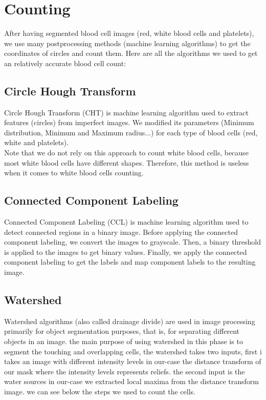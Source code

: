 \section{Counting}
\vspace{0.2in}
\hspace*{0.16in}
After having segmented blood cell images (red, white blood cells and platelets), we use many postprocessing methods (machine learning algorithms) to get the coordinates of circles and count them.
Here are all the algorithms we used to get an relatively accurate blood cell count:

\subsection{Circle Hough Transform}
Circle Hough Transform (CHT) is machine learning algorithm used to extract features (circles) from imperfect images.
We modified its parameters (Minimum distribution, Minimum and Maximum radius...) for each type of blood cells (red, white and platelets).\\
Note that we do not rely on this approach to count white blood cells, because most white blood cells have different shapes.
Therefore, this method is useless when it comes to white blood cells counting.

\subsection{Connected Component Labeling}
Connected Component Labeling (CCL) is machine learning algorithm used to detect connected regions in a binary image.
Before applying the connected component labeling, we convert the images to grayscale. Then, a binary threshold is applied to the images to get binary values.
Finally, we apply the connected component labeling to get the labels and map component labels to the resulting image.

\subsection{Watershed}
Watershed algorithms (also called drainage divide) are used in image processing primarily for object segmentation purposes, that is, for separating different objects in an image. the main purpose of using watershed in this phase is to segment the touching and overlapping cells, the watershed takes two inputs, first i takes an image with different intensity levels in our-case the distance transform of our mask where the intensity levels represents reliefs. the second input is the water sources in our-case we extracted local maxima from the distance transform image. we can see below the steps we used to count the cells.


